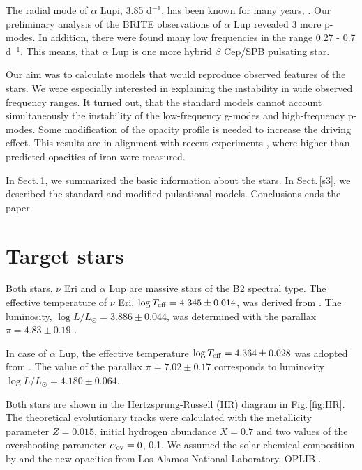 \documentclass{ptapap}
\begin{document}
The radial mode of $\alpha$ Lupi, 3.85 d$^{-1}$, has been known for many years, \citep[e.g.][]{Rodgers1962,Lampens1982,Mathias1994}. Our preliminary analysis of the BRITE observations of $\alpha$ Lup revealed 3 more p-modes. In addition, there were found many low frequencies in the range 0.27 - 0.7 d$^{-1}$. This means, that $\alpha$ Lup is one more hybrid $\beta$ Cep/SPB pulsating star.

Our aim was to calculate models that would reproduce observed features of the stars.
We were especially interested in explaining the instability in wide observed frequency ranges. It turned out, that the standard models cannot account simultaneously the instability of the low-frequency g-modes and high-frequency p-modes. Some modification of the opacity profile is needed to increase the driving effect. This results are in alignment with recent experiments \citep{Bailey_e2015}, where higher than predicted opacities of iron were measured.

In Sect.\,\ref{s2}, we summarized the basic information about the stars. In Sect.\,\ref{s3}, we described the standard and modified pulsational models. Conclusions ends the paper.


\section{Target stars}
\label{s2}

Both stars, $\nu$ Eri and $\alpha$ Lup are massive stars of the B2 spectral type. The effective temperature of $\nu$ Eri, $\log{T_{\rm{eff}}}=4.345\pm0.014$, was derived from \citet{JDD2005}. The luminosity, $\log{L/L_{\odot}}=3.886\pm0.044$, was determined with the parallax $\pi=4.83\pm0.19$ \citep{2007A&A...474..653V}.



In case of $\alpha$ Lup, the effective temperature $\log{T_{\rm{eff}}}=4.364\pm0.028$ was adopted from \citet{2009A&A...501..297Z}. The value of the parallax $\pi=7.02\pm0.17$ \citep{2007A&A...474..653V} corresponds to luminosity $\log{L/L_{\odot}}=4.180\pm0.064$.

Both stars are shown in the Hertzsprung-Russell (HR) diagram in Fig.\,\ref{fig:HR}. The theoretical evolutionary tracks were calculated with the metallicity parameter $Z=0.015$, initial hydrogen abundance $X=0.7$ and two values of the overshooting parameter $\alpha_{\rm{ov}}=0$, 0.1. We assumed the solar chemical composition by \citet{AGSS09} and the new opacities from Los Alamos National Laboratory, OPLIB \citep{OPLIB2,OPLIB1}.
\end{document}
